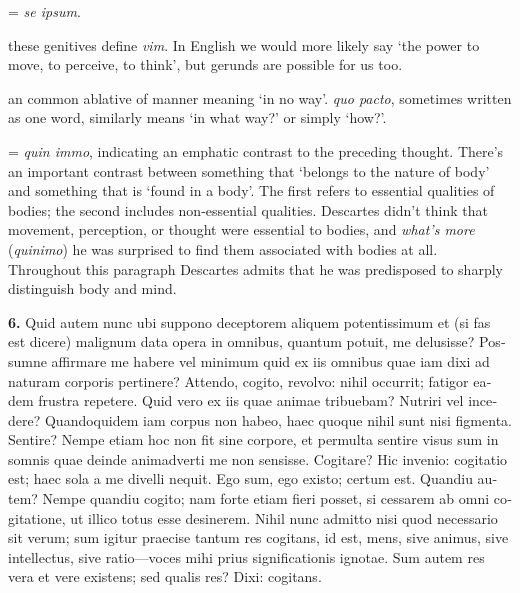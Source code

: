  = \textit{se ipsum}.

 these genitives define \textit{vim}. In English we would more likely say `the power to move, to perceive, to think', but gerunds are possible for us too.

 an common ablative of manner meaning `in no way'. \textit{quo pacto}, sometimes written as one word, similarly means `in what way?' or simply `how?'.

 = \textit{quin immo}, indicating an emphatic contrast to the preceding thought. There's an important contrast between something that `belongs to the nature of body' and something that is `found in a body'. The first refers to essential qualities of bodies; the second includes non-essential qualities. Descartes didn't think that movement, perception, or thought were essential to bodies, and \textit{what's more} (\textit{quinimo}) he was surprised to find them associated with bodies at all. Throughout this paragraph Descartes admits that he was predisposed to sharply distinguish body and mind.

\clearpage

\beginnumbering
\pstart
\begin{latin}
    \textenglish{\textbf{6.}} Quid autem nunc ubi suppono deceptorem aliquem potentissimum et (si fas est dicere) malignum data opera in omnibus, quantum potuit, me delusisse? Possumne affirmare me habere vel minimum quid ex iis omnibus quae iam dixi ad naturam corporis pertinere? Attendo, cogito, revolvo: nihil occurrit; fatigor eadem frustra repetere. Quid vero ex iis quae animae tribuebam? Nutriri vel incedere? Quandoquidem iam corpus non habeo, haec quoque nihil sunt nisi figmenta. Sentire? Nempe etiam hoc non fit sine corpore, et permulta sentire visus sum in somnis quae deinde animadverti me non sensisse. Cogitare? Hic invenio: cogitatio est; haec sola a me divelli nequit. Ego sum, ego existo; certum est. Quandiu autem? Nempe quandiu cogito; nam forte etiam fieri posset, si cessarem ab omni cogitatione, ut illico totus esse desinerem. Nihil nunc admitto nisi quod necessario sit verum; sum igitur praecise tantum res cogitans, id est, mens, sive animus, sive intellectus, sive ratio---voces mihi prius significationis ignotae. Sum autem res vera et vere existens; sed qualis res? Dixi: cogitans.
\end{latin}
\pend
\endnumbering

